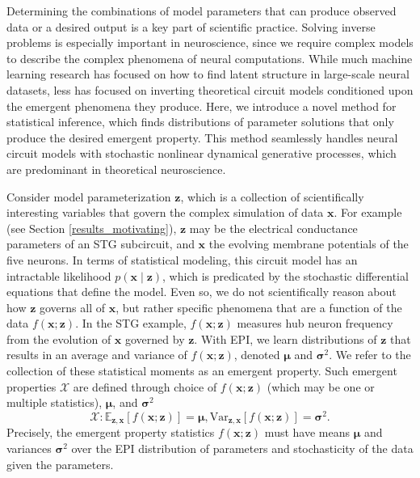 \documentclass[11pt]{article}
\begin{document}
Determining the combinations of model parameters that can produce observed data or a desired output is a key part of scientific practice.
Solving inverse problems is especially important in neuroscience, since we require complex models to describe the complex phenomena of neural computations.
While much machine learning research has focused on how to find latent structure in large-scale neural datasets, less has focused on inverting theoretical circuit models conditioned upon the emergent phenomena they produce.
Here, we introduce a novel method for statistical inference, which finds distributions of parameter solutions that only produce the desired emergent property.
This method seamlessly handles neural circuit models with stochastic nonlinear dynamical generative processes, which are predominant in theoretical neuroscience.

 
Consider model parameterization $\mathbf{z}$, which is a collection of scientifically interesting variables that govern the complex simulation of data $\mathbf{x}$.
For example (see Section \ref{results_motivating}), $\mathbf{z}$ may be the electrical conductance parameters of an STG subcircuit, and $\mathbf{x}$ the evolving membrane potentials of the five neurons.
In terms of statistical modeling, this circuit model has an intractable likelihood $p(\mathbf{x} \mid \mathbf{z})$, which is predicated by the stochastic differential equations that define the model.
Even so, we do not scientifically reason about how $\mathbf{z}$ governs all of $\mathbf{x}$, but rather specific phenomena that are a function of the data $f(\mathbf{x}; \mathbf{z})$.
In the STG example, $f(\mathbf{x}; \mathbf{z})$ measures hub neuron frequency from the evolution of $\mathbf{x}$ governed by $\mathbf{z}$.
With EPI, we learn distributions of $\mathbf{z}$ that results in an average and variance of $f(\mathbf{x}; \mathbf{z})$, denoted $\bm{\mu}$ and $\bm{\sigma}^2$.
We refer to the collection of these statistical moments as an emergent property.
Such emergent properties $\mathcal{X}$ are defined through choice of $f(\mathbf{x}; \mathbf{z})$ (which may be one or multiple statistics), $\bm{\mu}$, and $\bm{\sigma}^2$
 \begin{equation}
\mathcal{X}: \mathbb{E}_{\mathbf{z},\mathbf{x}}\left[f(\mathbf{x}; \mathbf{z})\right] = \bm{\mu}, \text{Var}_{\mathbf{z},\mathbf{x}}\left[f(\mathbf{x}; \mathbf{z})\right] = \bm{\sigma}^2.
\end{equation}
Precisely, the emergent property statistics $f(\mathbf{x}; \mathbf{z})$ must have means $\bm{\mu}$ and variances $\bm{\sigma}^2$  over the EPI distribution of parameters and stochasticity of the data given the parameters.  
\end{document}
